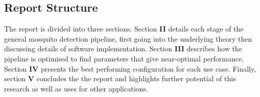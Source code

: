     \subsection{Report Structure}
    \label{subsec:bg-intro-structure}
        The report is divided into three sections. Section \textbf{II} details each stage of the general mosquito detection pipeline, first going into the underlying theory then discussing details of software implementation. Section \textbf{III} describes how the pipeline is optimised to find parameters that give near-optimal performance.
        Section \textbf{IV} presents the best performing configuration for each use case. Finally, section \textbf{V} concludes the the report and highlights further potential of this research as well as uses for other applications. 
